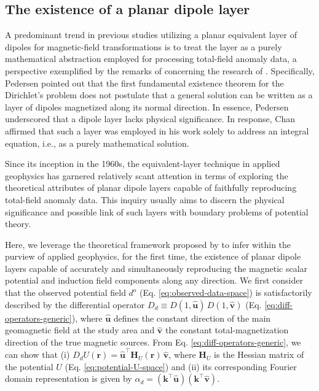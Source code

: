\subsection{The existence of a planar dipole layer}

A predominant trend in previous studies utilizing a planar equivalent layer of dipoles for 
magnetic-field transformations 
is to treat the layer as a purely mathematical abstraction employed for processing total-field 
anomaly data, a perspective exemplified by the remarks of \cite{pedersen1989} concerning the 
research of \cite{bhattacharyya_chan1977}.
Specifically, Pedersen pointed out that the first fundamental existence theorem for the 
Dirichlet's problem does not postulate that a general solution can be written as a layer of 
dipoles magnetized along its 
normal direction. In essence, Pedersen underscored that a dipole layer lacks physical 
significance.
In response, Chan affirmed that such a layer was employed in his work 
solely to address an integral equation, i.e., as a purely mathematical solution.

Since its inception in the 1960s, the equivalent-layer technique in applied geophysics has 
garnered relatively scant attention in terms of exploring the theoretical attributes of planar 
dipole layers capable of faithfully reproducing total-field anomaly data. 
This inquiry usually aims to discern the physical significance and possible link of such 
layers with boundary problems of potential theory.

Here, we leverage the theoretical framework proposed by \cite{oliveirajr_etal2026_1} to infer 
within the purview of applied geophysics, for the first time, the existence of planar dipole 
layers capable of accurately and simultaneously reproducing the magnetic scalar potential and 
induction field components along any direction.
We first consider that the observed potential field $d^{o}$ (Eq. 
\ref{eq:observed-data-space}) is satisfactorily described by the differential operator 
$D_{d} \equiv D(1, \hat{\mathbf{u}}) \, D(1, \hat{\mathbf{v}})$
(Eq. \ref{eq:diff-operators-generic}), where $\hat{\mathbf{u}}$ defines the constant 
direction of the main geomagnetic field at the study area and $\hat{\mathbf{v}}$ the constant 
total-magnetization direction of the true magnetic sources.
From Eq. \ref{eq:diff-operators-generic}, we can show that 
(i) $D_{d}U(\mathbf{r}) = \hat{\mathbf{u}}^{\top} \mathbf{H}_{U}(\mathbf{r}) \, \hat{\mathbf{v}}$,
where $\mathbf{H}_{U}$ is the Hessian matrix \citep[e.g.,][p. 158]{kaplan2002} of
the potential $U$ (Eq. \ref{eq:potential-U-space}) and (ii) its corresponding 
Fourier domain representation is given by 
$\alpha_{d} = \left(\mathbf{k}^{\top} \hat{\mathbf{u}} \right)\left(\mathbf{k}^{\top} \hat{\mathbf{v}} \right)$.

